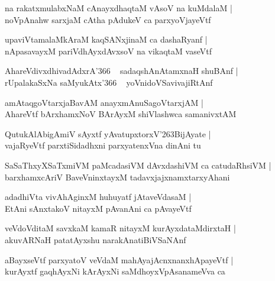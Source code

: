 \documentclass[twoside,12pt,openright]{book}
\def\S{\char'263}
\newcounter{shloka}[chapter]
\begin{document}
\begin{shloka}
na rakatxmulabxNaM cAnayxdhaqtaM vAsoV na kuMdalaM |\\
noVpAnahw sarxjaM cAtha pAdukeV ca parxyoVjayeVtf 
\end{shloka}

\begin{shloka}
upaviVtamalaMkAraM kaqSANxjinaM ca dashaRyanf |\\
nApasavayxM pariVdhAyxdAvxsoV na vikaqtaM vaseVtf
\end{shloka}

\begin{shloka}
AhareVdivxdhivadAdxrA\char'366 ~ sadaqshAnAtamxnaH shuBAnf |\\
rUpalakaSxNa saMyukAtx\char'366 ~ yoVnidoVSavivajiRtAnf 
\end{shloka}

\begin{shloka}
amAtaqgoVtarxjaBavAM anayxmAnuSagoVtarxjAM |\\
AhareVtf bArxhamxNoV BArAyxM shiVlashwca samanivxtAM 
\end{shloka}

\begin{shloka}
QutukAlAbigAmiV sAyxtf yAvatupxtorxV\S BijAyate |\\
vajaRyeVtf parxtiSidadhxni parxyatenxVna dinAni tu 
\end{shloka}

\begin{shloka}
SaSaThxyXSaTxmiVM paMcadasiVM dAvxdashiVM ca catudaRhsiVM |\\
barxhamxcAriV BaveVninxtayxM tadavxjajxnamxtarxyAhani 
\end{shloka}

\begin{shloka}
adadhiVta vivAhAginxM huhuyatf jAtaveVdasaM |\\
EtAni sAnxtakoV nitayxM pAvanAni ca pAvayeVtf 
\end{shloka}

\begin{shloka}
veVdoVditaM savxkaM kamaR nitayxM kurAyxdataMdirxtaH |\\
akuvARNaH patatAyxshu narakAnatiBiVSaNAnf 
\end{shloka}

\begin{shloka}
aBayxseVtf parxyatoV veVdaM mahAyajAcnxnanxhApayeVtf |\\
kurAyxtf gaqhAyxNi kArAyxNi saMdhoyxVpAsanameVva ca
\end{shloka}
\end{document}
